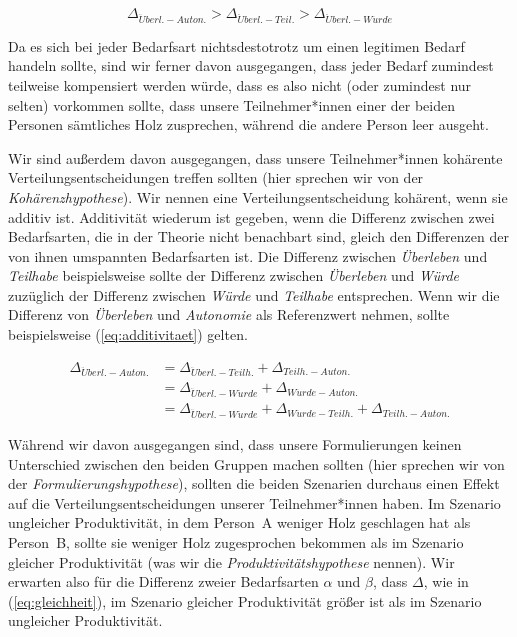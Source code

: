 \documentclass[justified,nobib,nohyper,symmetric,twoside]{tufte-book}
\begin{document}
\begin{equation}\label{eq:hierarchie}
   \Delta_{\ddot{U}berl.-Auton.}>\Delta_{\ddot{U}berl.-Teil.}>\Delta_{\ddot{U}berl.-W\ddot{u}rde}
\end{equation}

Da es sich bei jeder Bedarfsart nichtsdestotrotz um einen legitimen Bedarf handeln sollte, sind wir ferner davon ausgegangen, dass jeder Bedarf zumindest teilweise kompensiert werden würde, dass es also nicht (oder zumindest nur selten) vorkommen sollte, dass unsere Teilnehmer*innen einer der beiden Personen sämtliches Holz zusprechen, während die andere Person leer ausgeht.

Wir sind außerdem davon ausgegangen, dass unsere Teilnehmer*innen kohärente Verteilungsentscheidungen treffen sollten (hier sprechen wir von der \textit{Kohärenz\-hypothese}).
Wir nennen eine Verteilungsentscheidung kohärent, wenn sie additiv ist.
Additivität wiederum ist gegeben, wenn die Differenz zwischen zwei Bedarfsarten, die in der Theorie nicht benachbart sind, gleich den Differenzen der von \mbox{ihnen} umspannten Bedarfsarten ist.
Die Differenz zwischen \textit{\mbox{Überleben}} und \textit{Teilhabe} beispielsweise sollte der Differenz zwischen \textit{Überleben} und \textit{\mbox{Würde}} zuzüglich der Differenz zwischen \textit{Würde} und \textit{Teilhabe} entsprechen.
Wenn wir die Differenz von \textit{Überleben} und \textit{Autonomie} als Referenzwert nehmen, sollte beispielsweise (\ref{eq:additivitaet}) gelten.

\begin{equation}\label{eq:additivitaet}
   \begin{split}
   \Delta_{\ddot{U}berl.-Auton.} & = \Delta_{\ddot{U}berl.-Teilh.} + \Delta_{Teilh.-Auton.} \\
                                 & = \Delta_{\ddot{U}berl.-W\ddot{u}rde} + \Delta_{W\ddot{u}rde-Auton.} \\
                                 & = \Delta_{\ddot{U}berl.-W\ddot{u}rde} + \Delta_{W\ddot{u}rde-Teilh.} + \Delta_{Teilh.-Auton.}
   \end{split}
\end{equation}

Während wir davon ausgegangen sind, dass unsere Formulierungen keinen Unterschied zwischen den beiden Gruppen machen sollten (hier sprechen wir von der \textit{Formulierungshypothese}), sollten die beiden Szenarien durchaus einen Effekt auf die Verteilungsentscheidungen unserer Teilnehmer*innen haben.
Im Szenario ungleicher Produktivität, in dem Person~A weniger Holz geschlagen hat als Person~B, sollte sie weniger Holz zugesprochen bekommen als im Szenario gleicher Produktivität (was wir die \textit{Produktivitätshypothese} nennen).
Wir erwarten also für die Differenz zweier Bedarfsarten $\alpha$ und $\beta$, dass $\Delta$, wie in (\ref{eq:gleichheit}), im Szenario gleicher Produktivität größer ist als im Szenario ungleicher Produktivität.
\end{document}
